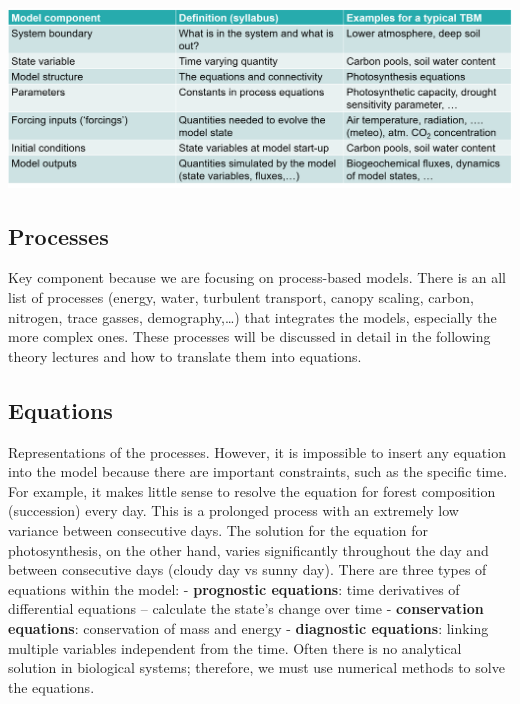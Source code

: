\documentclass[12pt,oneside]{book}
\begin{document}
\begin{center}
\label{table:components}

\begin{center}\includegraphics[width=0.8\linewidth]{figures/chap1/table_components} \end{center}
\end{center}

\subsection{Processes}\label{processes}

Key component because we are focusing on process-based models. There is
an all list of processes (energy, water, turbulent transport, canopy
scaling, carbon, nitrogen, trace gasses, demography,\ldots{}) that
integrates the models, especially the more complex ones. These processes
will be discussed in detail in the following theory lectures and how to
translate them into equations.

\subsection{Equations}\label{equations}

Representations of the processes. However, it is impossible to insert
any equation into the model because there are important constraints,
such as the specific time. For example, it makes little sense to resolve
the equation for forest composition (succession) every day. This is a
prolonged process with an extremely low variance between consecutive
days. The solution for the equation for photosynthesis, on the other
hand, varies significantly throughout the day and between consecutive
days (cloudy day vs sunny day). There are three types of equations
within the model: - \textbf{prognostic equations}: time derivatives of
differential equations -- calculate the state's change over time -
\textbf{conservation equations}: conservation of mass and energy -
\textbf{diagnostic equations}: linking multiple variables independent
from the time. Often there is no analytical solution in biological
systems; therefore, we must use numerical methods to solve the
equations.
\end{document}
